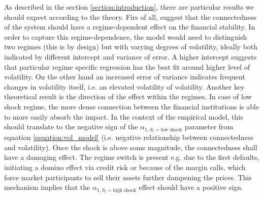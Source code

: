 \documentclass[12pt]{article}
\begin{document}
As described in the section \ref{section:introduction}, there are particular results we should expect according to the theory. Firs of all, \citet{acemoglu15} suggest that the connectedness of the system should have a regime-dependent effect on the financial stability. In order to capture this regime-dependence, the model would need to distinguish two regimes (this is by design) but with varying degrees of volatility, ideally both indicated by different intercept and variance of error. A higher intercept suggests that particular regime specific regression has the best fit around higher level of volatility. On the other hand an increased error of variance indicates frequent changes in volatility itself, i.e. an elevated volatility of volatility. Another key theoretical result is the direction of the effect within the regimes. In case of low shock regime, the more dense connection between the financial institutions is able to more easily absorb the impact. In the context of the empirical model, this should translate to the negative sign of the $\alpha_{1, S_t = \text{low shock}}$ parameter from equation \ref{equation:vol_model} (i.e. negative relationship between connectedness and volatility). Once the shock is above some magnitude, the connectedness shall have a damaging effect. The regime switch is present e.g. due to the first defaults, initiating a domino effect via credit risk or because of the margin calls, which force market participants to sell their assets further dampening the prices. This mechanism implies that the $\alpha_{1, S_t = \text{high shock}}$ effect should have a positive sign.
\end{document}
